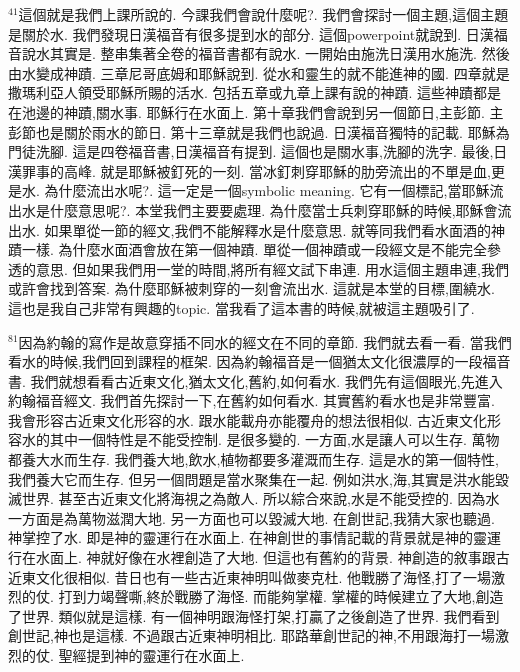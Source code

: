 \documentclass{book}
\begin{document}
$^{41}$這個就是我們上課所說的.
今課我們會說什麼呢?.
我們會探討一個主題,這個主題是關於水.
我們發現日漢福音有很多提到水的部分.
這個powerpoint就說到.
日漢福音說水其實是.
整串集著全卷的福音書都有說水.
一開始由施洗日漢用水施洗.
然後由水變成神蹟.
三章尼哥底姆和耶穌說到.
從水和靈生的就不能進神的國.
四章就是撒瑪利亞人領受耶穌所賜的活水.
包括五章或九章上課有說的神蹟.
這些神蹟都是在池邊的神蹟,關水事.
耶穌行在水面上.
第十章我們會說到另一個節日,主彭節.
主彭節也是關於雨水的節日.
第十三章就是我們也說過.
日漢福音獨特的記載.
耶穌為門徒洗腳.
這是四卷福音書,日漢福音有提到.
這個也是關水事,洗腳的洗字.
最後,日漢罪事的高峰.
就是耶穌被釘死的一刻.
當冰釘刺穿耶穌的肋旁流出的不單是血,更是水.
為什麼流出水呢?.
這一定是一個symbolic meaning.
它有一個標記,當耶穌流出水是什麼意思呢?.
本堂我們主要要處理.
為什麼當士兵刺穿耶穌的時候,耶穌會流出水.
如果單從一節的經文,我們不能解釋水是什麼意思.
就等同我們看水面酒的神蹟一樣.
為什麼水面酒會放在第一個神蹟.
單從一個神蹟或一段經文是不能完全參透的意思.
但如果我們用一堂的時間,將所有經文試下串連.
用水這個主題串連,我們或許會找到答案.
為什麼耶穌被刺穿的一刻會流出水.
這就是本堂的目標,圍繞水.
這也是我自己非常有興趣的topic.
當我看了這本書的時候,就被這主題吸引了.

$^{81}$因為約翰的寫作是故意穿插不同水的經文在不同的章節.
我們就去看一看.
當我們看水的時候,我們回到課程的框架.
因為約翰福音是一個猶太文化很濃厚的一段福音書.
我們就想看看古近東文化,猶太文化,舊約,如何看水.
我們先有這個眼光,先進入約翰福音經文.
我們首先探討一下,在舊約如何看水.
其實舊約看水也是非常豐富.
我會形容古近東文化形容的水.
跟水能載舟亦能覆舟的想法很相似.
古近東文化形容水的其中一個特性是不能受控制.
是很多變的.
一方面,水是讓人可以生存.
萬物都養大水而生存.
我們養大地,飲水,植物都要多灌溉而生存.
這是水的第一個特性,我們養大它而生存.
但另一個問題是當水聚集在一起.
例如洪水,海,其實是洪水能毀滅世界.
甚至古近東文化將海視之為敵人.
所以綜合來說,水是不能受控的.
因為水一方面是為萬物滋潤大地.
另一方面也可以毀滅大地.
在創世記,我猜大家也聽過.
神掌控了水.
即是神的靈運行在水面上.
在神創世的事情記載的背景就是神的靈運行在水面上.
神就好像在水裡創造了大地.
但這也有舊約的背景.
神創造的敘事跟古近東文化很相似.
昔日也有一些古近東神明叫做麥克杜.
他戰勝了海怪,打了一場激烈的仗.
打到力竭聲嘶,終於戰勝了海怪.
而能夠掌權.
掌權的時候建立了大地,創造了世界.
類似就是這樣.
有一個神明跟海怪打架,打贏了之後創造了世界.
我們看到創世記,神也是這樣.
不過跟古近東神明相比.
耶路華創世記的神,不用跟海打一場激烈的仗.
聖經提到神的靈運行在水面上.
\end{document}
